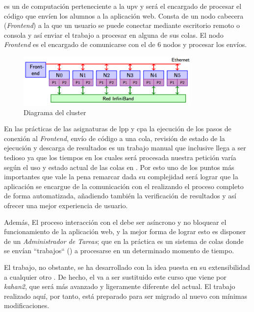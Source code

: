 \documentclass[11pt,spanish,listoffigures,listoftables]{tfgetsinf}
\begin{document}
\kahan es un  de computación perteneciente a la \acrshort{upv} \cite{link-cluster-kahan} y será el encargado de procesar el código que envíen los alumnos a la aplicación web. Consta de un nodo cabecera (\textit{Frontend}) a la que un usuario se puede conectar mediante escritorio remoto o consola y así enviar el trabajo a procesar en alguna de sus colas. El nodo \textit{Frontend} es el encargado de comunicarse con el  de 6 nodos y procesar los envíos.

\begin{figure}[!ht]
	\centering
	\includegraphics[width=0.8\textwidth]{img/kahan-cluster}
	\caption[Diagrama del cluster \kahan]{Diagrama del cluster \kahan}
	\label{figura:kahan-cluster}
\end{figure}

En las prácticas de las asignaturas de \acrshort{lpp} y \acrshort{cpa} la ejecución de los pasos de conexión al \textit{Frontend}, envío de código a una cola, revisión de estado de la ejecución y descarga de resultados es un trabajo manual que inclusive llega a ser tedioso ya que los tiempos en los cuales será procesada nuestra petición varía según el uso y estado actual de las colas en \kahan. Por esto uno de los puntos más importantes que vale la pena remarcar dada su complejidad será lograr que la aplicación se encargue de la comunicación con el  realizando el proceso completo de forma automatizada, añadiendo también la verificación de resultados y así ofrecer una mejor experiencia de usuario. 

Además, El proceso interacción con el  \kahan debe ser asíncrono y no bloquear el funcionamiento de la aplicación web, y la mejor forma de lograr esto es disponer de un \textit{Administrador de Tareas}; que en la práctica es un sistema de colas donde se envían ``trabajos`` () a procesarse en un determinado momento de tiempo.

El trabajo, no obstante, se ha desarrollado con la idea puesta en su extensibilidad a cualquier otro . De hecho, el   \kahan va a ser sustituido este curso que viene por \textit{kahan2}, que será más avanzado y ligeramente diferente del actual. El trabajo realizado aquí, por tanto, está preparado para ser migrado al nuevo   con mínimas modificaciones.
\end{document}
